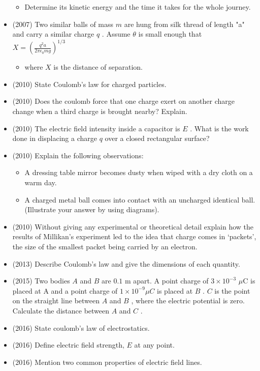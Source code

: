 \documentclass{article}
\begin{document}
\begin{itemize}
\begin{itemize}
\item Determine its kinetic energy and the time it takes for the whole journey.
\end{itemize}
\item (2007)  Two similar balls of mass $ m$ are hung from silk thread of length "a" and carry a similar charge $ q$ .  Assume $ \theta $ is small enough that $ X = (\frac{q^2 a}{2 \pi \epsilon_0 m g})^{1/3}$
 \begin{itemize}
\item where $ X$ is the distance of separation.
\end{itemize}
\item (2010)  State Coulomb’s law for charged particles.
\item (2010)  Does the coulomb force that one charge exert on another charge change when a third charge is brought nearby? Explain.
\item (2010)  The electric field intensity inside a capacitor is $ E$ . What is the work done in displacing a charge $ q$ over a closed rectangular surface?
\item (2010)  Explain the following observations:
 \begin{itemize}
\item A dressing table mirror becomes dusty when wiped with a dry cloth on a warm day.
\item A charged metal ball comes into contact with an uncharged identical ball.  (Illustrate your answer by using diagrams).
\end{itemize}
\item (2010)  Without giving any experimental or theoretical detail explain how the results of Millikan’s experiment led to the idea that charge comes in ‘packets’, the size of the smallest packet being carried by an electron. 
\item (2013)  Describe Coulomb’s law and give the dimensions of each quantity.
\item (2015)  Two bodies $ A$ and $ B$ are $ 0.1$ m apart.  A point charge of $ 3\times 10^{-3}$ $\mu$C is placed at A and a point charge of $ 1\times 10^{-9}\mu C$ is placed at $ B$ .  $ C$ is the point on the straight line between $ A$ and $ B$ , where the electric potential is zero.  Calculate the distance between $ A$ and $ C$ .
\item (2016)  State coulomb’s law of electrostatics.
\item (2016)  Define electric field strength, $ E$ at any point.
\item (2016)  Mention two common properties of electric field lines.

\end{itemize}
\end{document}
